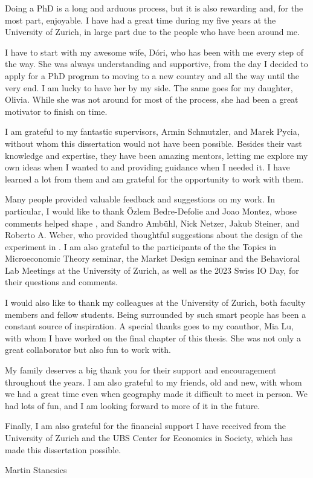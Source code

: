 Doing a PhD is a long and arduous process, but it is also rewarding and, for the most part, enjoyable.
I have had a great time during my five years at the University of Zurich, in large part due to the people who have been around me.

I have to start with my awesome wife, Dóri, who has been with me every step of the way.
She was always understanding and supportive, from the day I decided to apply for a PhD program to moving to a new country and all the way until the very end.
I am lucky to have her by my side.
The same goes for my daughter, Olivia.
While she was not around for most of the process, she had been a great motivator to finish on time.

I am grateful to my fantastic supervisors, Armin Schmutzler, and Marek Pycia, without whom this dissertation would not have been possible.
Besides their vast knowledge and expertise, they have been amazing mentors, letting me explore my own ideas when I wanted to and providing guidance when I needed it.
I have learned a lot from them and am grateful for the opportunity to work with them.

Many people provided valuable feedback and suggestions on my work.
In particular, I would like to thank Özlem Bedre-Defolie and Joao Montez, whose comments helped shape , and Sandro Ambühl, Nick Netzer, Jakub Steiner, and Roberto A. Weber, who provided thoughtful suggestions about the design of the experiment in .
I am also grateful to the participants of the the Topics in Microeconomic Theory seminar, the Market Design seminar and the Behavioral Lab Meetings at the University of Zurich, as well as the 2023 Swiss IO Day, for their questions and comments.

I would also like to thank my colleagues at the University of Zurich, both faculty members and fellow students.
Being surrounded by such smart people has been a constant source of inspiration.
A special thanks goes to my coauthor, Mia Lu, with whom I have worked on the final chapter of this thesis.
She was not only a great collaborator but also fun to work with.

My family deserves a big thank you for their support and encouragement throughout the years.
I am also grateful to my friends, old and new, with whom we had a great time even when geography made it difficult to meet in person.
We had lots of fun, and I am looking forward to more of it in the future.

Finally, I am also grateful for the financial support I have received from the University of Zurich and the UBS Center for Economics in Society, which has made this dissertation possible.

\vspace{0.5 cm}\hfill Martin Stancsics
